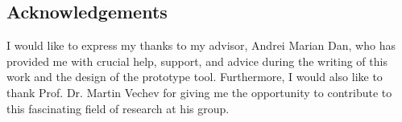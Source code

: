 \subsection{Acknowledgements}

I would like to express my thanks to my advisor, Andrei Marian Dan, who has provided me with crucial help, support, and advice during the writing of this work and the design of the prototype tool. Furthermore, I would also like to thank Prof. Dr. Martin Vechev for giving me the opportunity to contribute to this fascinating field of research at his group.